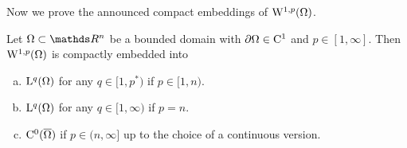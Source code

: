 Now we prove the announced compact embeddings of $\mathrm{W}^{1,p}(\Omega)$.

\begin{thm}
  \label{thm:RellichKondrachov}
  Let $\Omega \subset \R^n$ be a bounded domain with $\partial\Omega \in \mathrm{C}^1$ and $p \in [1,\infty]$.
  Then $\mathrm{W}^{1,p}(\Omega)$ is compactly embedded into
  \begin{enumerate}[a)]
    \item $\mathrm{L}^q(\Omega)$ for any $q \in [1,p^*)$ if $p \in [1,n)$.
    \item $\mathrm{L}^q(\Omega)$ for any $q \in [1,\infty)$ if $p = n$.
    \item $\mathrm{C}^0(\overline\Omega)$ if $p \in (n,\infty]$ up to the choice of a continuous version.
  \end{enumerate}
\end{thm}

